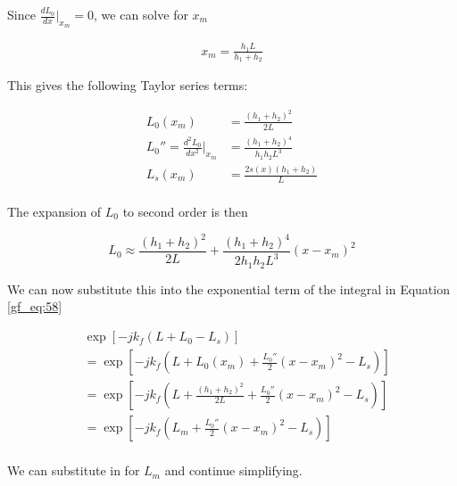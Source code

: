 \noindent Since $\frac{dL_0}{dx}\big|_{x_m} = 0$, we can solve for $x_m$

\begin{equation}
\begin{gathered}
x_m = \frac{h_1L}{h_1+h_2}
\end{gathered}
\label{gf_eq:64}
\end{equation}
\renewcommand{\baselinestretch}{2} \small\normalsize

\noindent This gives the following Taylor series terms:

\begin{equation}
\begin{aligned}
L_0(x_m) &= \frac{(h_1+h_2)^2}{2L} \\
L_0''=\frac{d^2L_0}{dx^2}\bigg|_{x_m}  &= \frac{(h_1+h_2)^4}{h_1h_2L^3} \\
L_s(x_m) &= \frac{2s(x)(h_1 + h_2)}{L}\\
\end{aligned}
\label{gf_eq:65}
\end{equation}
\renewcommand{\baselinestretch}{2} \small\normalsize

\noindent The expansion of $L_0$ to second order is then

\begin{equation}
L_0 \approx \frac{(h_1+h_2)^2}{2L} + \frac{(h_1+h_2)^4}{2h_1h_2L^3}(x-x_m)^2
\label{gf_eq:66}
\end{equation}
\renewcommand{\baselinestretch}{2} \small\normalsize

\noindent We can now substitute this into the exponential term of the integral in Equation \ref{gf_eq:58}

\begin{equation}
\begin{aligned}
&\exp\left[-jk_f\left( L+L_0-L_s\right) \right]\\
&= \exp\left[-jk_f\left( L+L_0(x_m) + \frac{L_0''}{2}(x-x_m)^2-L_s\right) \right]\\
&= \exp\left[-jk_f\left( L+\frac{(h_1+h_2)^2}{2L} + \frac{L_0''}{2}(x-x_m)^2-L_s\right)\right]\\
&=\exp\left[-jk_f\left(L_m+\frac{L_0''}{2}(x-x_m)^2-L_s\right)\right]\\
\label{gf_eq:67}
\end{aligned}
\end{equation}
\renewcommand{\baselinestretch}{2} \small\normalsize

\noindent We can substitute in for $L_m$ and continue simplifying.

